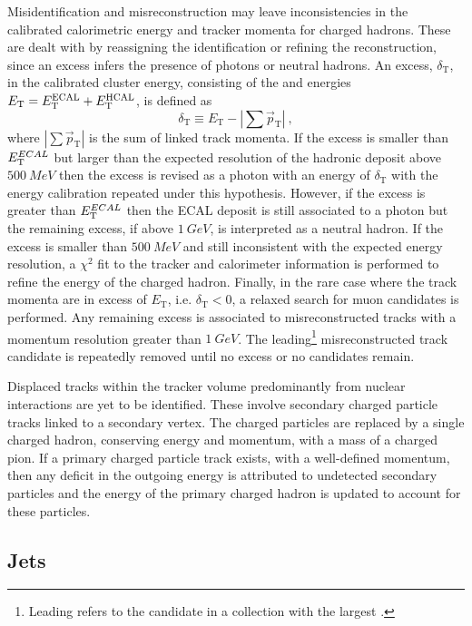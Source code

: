 Misidentification and misreconstruction may leave inconsistencies in the
calibrated calorimetric energy and tracker momenta for charged hadrons. These
are dealt with by reassigning the identification or refining the reconstruction,
since an excess infers the presence of photons or neutral hadrons. An excess, $\delta_\mathrm{T}$, in the calibrated cluster energy, consisting of the \ECAL and \HCAL energies $E_{\mathrm{T}}=E_{\mathrm{T}}^{\mathrm{ECAL}} + E_{\mathrm{T}}^{\mathrm{HCAL}}$, is defined as
%
\begin{equation}
    \delta_\mathrm{T} \equiv E_{\mathrm{T}} - |\sum \vec{p}_{\mathrm{T}}|\ ,
\end{equation}
%
where $|\sum \vec{p}_{\mathrm{T}}|$ is the sum of linked track momenta. If the excess is smaller than $E_{\mathrm{T}}^{ECAL}$ but larger than the expected resolution of the hadronic deposit above $\SI{500}{MeV}$ then the excess is revised as a photon with an energy of $\delta_{\mathrm{T}}$ with the energy calibration repeated under this hypothesis. However, if the excess is greater than $E_{\mathrm{T}}^{ECAL}$ then the ECAL deposit is still associated to a photon but the remaining excess, if above $\SI{1}{GeV}$, is interpreted as a neutral hadron. If the excess is smaller than $\SI{500}{MeV}$ and still inconsistent with the expected energy resolution, a $\chi^2$ fit to the tracker and calorimeter information is performed to refine the energy of the charged hadron. Finally, in the rare case where the track momenta are in excess of $E_{\mathrm{T}}$, i.e. $\delta_{\mathrm{T}}<0$, a relaxed search for muon candidates is performed. Any remaining excess is associated to misreconstructed tracks with a momentum resolution greater than ${\SI{1}{GeV}}$. The leading\footnote{Leading refers to the candidate in a collection with the largest \pt.} misreconstructed track candidate is repeatedly removed until no excess or no candidates remain.

Displaced tracks within the tracker volume predominantly from nuclear
interactions are yet to be identified. These involve secondary
charged particle tracks linked to a secondary vertex. The charged particles
are replaced by a single charged hadron, conserving energy and momentum, with
a mass of a charged pion. If a primary charged particle track exists, with a
well-defined momentum, then any deficit in the outgoing energy is attributed
to undetected secondary particles and the energy of the primary charged
hadron is updated to account for these particles.


\subsection{Jets}

